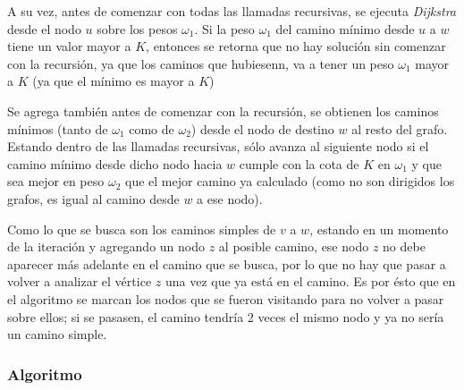 A su vez, antes de comenzar con todas las llamadas recursivas, se ejecuta \emph{Dijkstra} desde el nodo $u$ sobre los pesos $\omega_1$. Si la peso $\omega_1$ del camino m\'inimo desde $u$ a $w$ tiene un valor mayor a $K$, entonces se retorna que no hay soluci\'on sin comenzar con la recursi\'on, ya que los caminos que hubiesenn, va a tener un peso $\omega_1$ mayor a $K$ (ya que el m\'inimo es mayor a $K$)

Se agrega tambi\'en antes de comenzar con la recursi\'on, se obtienen los caminos m\'inimos (tanto de $\omega_1$ como de $\omega_2$) desde el nodo de destino $w$ al resto del grafo.
Estando dentro de las llamadas recursivas, s\'olo avanza al siguiente nodo si el camino m\'inimo desde dicho nodo hacia $w$ cumple con la cota de $K$ en $\omega_1$ y que sea mejor en peso $\omega_2$ que el mejor camino ya calculado (como no son dirigidos los grafos, es igual al camino desde $w$ a ese nodo).

Como lo que se busca son los caminos simples de $v$ a $w$, estando en un momento de la iteraci\'on y agregando un nodo $z$ al posible camino, ese nodo $z$ no debe aparecer m\'as adelante en el camino que se busca, por lo que no hay que pasar a volver a analizar el v\'ertice $z$ una vez que ya est\'a en el camino. Es por \'esto que en el algoritmo se marcan los nodos que se fueron visitando para no volver a pasar sobre ellos; si se pasasen, el camino tendr\'ia 2 veces el mismo nodo y ya no ser\'ia un camino simple.

\subsubsection{Algoritmo}


